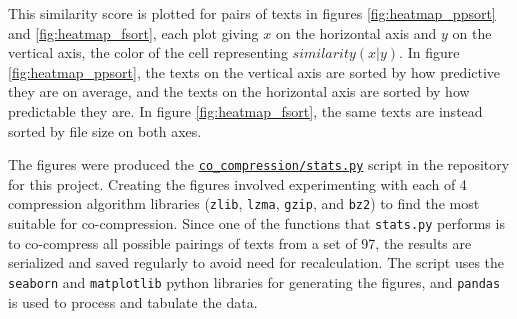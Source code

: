 This similarity score is plotted for pairs of texts in figures \ref{fig:heatmap_ppsort} and \ref{fig:heatmap_fsort}, each plot giving \(x\) on the horizontal axis and \(y\) on the vertical axis, the color of the cell representing \(similarity(x|y)\). In figure \ref{fig:heatmap_ppsort}, the texts on the vertical axis are sorted by how predictive they are on average, and the texts on the horizontal axis are sorted by how predictable they are. In figure \ref{fig:heatmap_fsort}, the same texts are instead sorted by file size on both axes.

The figures were produced the  \texttt{\href{https://github.com/Guy29/FYP/blob/main/Code/co_compression/stats.py}{co\_compression/stats.py}} script in the repository for this project. Creating the figures involved experimenting with each of 4 compression algorithm libraries (\texttt{zlib}, \texttt{lzma}, \texttt{gzip}, and \texttt{bz2}) to find the most suitable for co-compression. Since one of the functions that \texttt{stats.py} performs is to co-compress all possible pairings of texts from a set of 97, the results are serialized and saved regularly to avoid need for recalculation. The script uses the \texttt{seaborn} and \texttt{matplotlib} python libraries for generating the figures, and \texttt{pandas} is used to process and tabulate the data.

